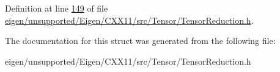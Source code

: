 Definition at line \hyperlink{eigen_2unsupported_2_eigen_2_c_x_x11_2src_2_tensor_2_tensor_reduction_8h_source_l00149}{149} of file \hyperlink{eigen_2unsupported_2_eigen_2_c_x_x11_2src_2_tensor_2_tensor_reduction_8h_source}{eigen/unsupported/\+Eigen/\+C\+X\+X11/src/\+Tensor/\+Tensor\+Reduction.\+h}.



The documentation for this struct was generated from the following file\+:\begin{DoxyCompactItemize}
\item 
eigen/unsupported/\+Eigen/\+C\+X\+X11/src/\+Tensor/\+Tensor\+Reduction.\+h\end{DoxyCompactItemize}
